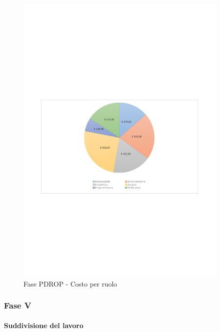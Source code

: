 \documentclass[../PianoProgetto.tex]{subfiles}
\begin{document}
	\begin{figure}[H]
		\centering
		\includegraphics[width=0.93\textwidth , trim=1.5cm 9cm 1.5cm 9cm]{grafici/PDROP/PDROP-costo}
			\caption{Fase PDROP - Costo per ruolo}
		\label{fig:CircleChart-fasePDROP_costo}
	\end{figure}
\vfill	
\newpage
	
	\subsubsection{Fase V}
				\paragraph{Suddivisione del lavoro}\
					
\end{document}
